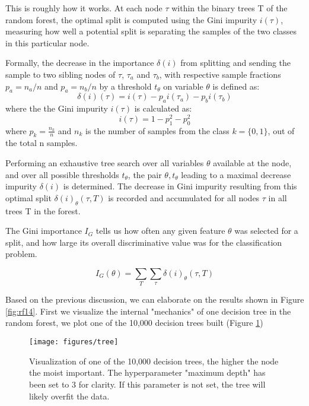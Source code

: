 \documentclass[preprint,12pt]{elsarticle}
\begin{document}
This is roughly how it works. At each node $\tau$ within the binary trees T of the random forest, the optimal split is computed using the Gini impurity $i(\tau)$, measuring how well a potential split is separating the samples of the two classes in this particular node.

Formally, the decrease in the importance $\delta(i)$ from splitting and sending the sample to two sibling nodes of $\tau$, $\tau_a$ and $\tau_b$, with respective sample fractions $p_a=n_a/n$ and $p_a=n_b/n$ by a threshold $t_\theta$ on variable $\theta$ is defined as:
\begin{equation}
\delta(i)(\tau) = i(\tau) - p_{a}i(\tau_{a})- p_{b}i(\tau_{b})
\label{eq:delatiatu}
\end{equation}
where the the Gini impurity $i(\tau)$ is calculated as: 
\begin{equation}
i(\tau) = 1 -p_{1}^2 - p_{0}^2
\label{eq:iatu}
\end{equation}
where $p_k = \frac{n_k}{n}$ and $n_k$ is the number of samples from the class $k =\{0,1\}$, out of the total n samples.

Performing an exhaustive tree search over all variables $\theta$ available at the node, and over all possible thresholds $t_\theta$, the pair $\theta, t_{\theta}$ leading to a maximal decrease impurity $\delta(i)$ is determined. The decrease in Gini impurity resulting from this optimal split $\delta(i)_{\theta}(\tau, T)$ is recorded and accumulated for all nodes $\tau$ in all trees T in the forest. 

The Gini importance $I_G$ tells us how often any given feature $\theta$ was selected for a split, and how large its overall discriminative value was for the classification problem.

\begin{equation}
I_{G}(\theta) = \sum_T \sum_{\tau} \delta(i)_{\theta}(\tau,T)
\end{equation}

Based on the previous discussion, we can elaborate on the results shown in Figure \ref{fig:rf14}. First we visualize the internal "mechanics" of one decision tree in the random forest, we plot one of the 10,000 decision trees built (Figure \ref{fig:RF_selectorgini})

\begin{figure}[!htb]
        \centering
        \texttt{[image: figures/tree]}
        \caption{Visualization of one of the 10,000 decision trees, the higher the node the moist important. The hyperparameter "maximum depth" has been set to 3 for clarity. If this parameter is not set, the tree will likely overfit the data.} 
        \label{fig:RF_selectorgini}
\end{figure}
\end{document}
